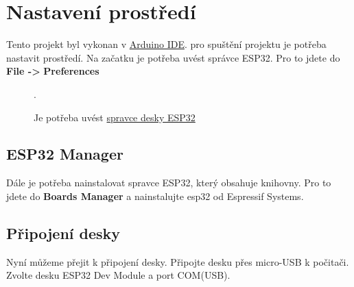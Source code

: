 \graphicspath{{Images/}}
\hypersetup{linkcolor=blue, urlcolor=blue}

\vspace{170pt}

\section{Nastavení prostředí}

\begin{spacing}{1.5}
    \fontsize{14}{14}\selectfont
    Tento projekt byl vykonan v \href{https://www.arduino.cc/en/software}{Arduino IDE}. pro spuštění projektu je potřeba nastavit prostředí. Na začatku je potřeba uvést správce ESP32. Pro to jdete do \textbf{File -> }\textbf{Preferences}
    
\begin{figure}[h]
    \centering
    \caption{Je potřeba uvést \href{https://dl.espressif.com/dl/package_esp32_index.json}{spravce desky ESP32}}.
    \label{step}
\end{figure} 

\end{spacing}

\subsection{ESP32 Manager}

\begin{spacing}{1.5}
\fontsize{14}{14}\selectfont
Dále je potřeba nainstalovat spravce ESP32, který obsahuje knihovny. Pro to jdete do \textbf{Boards Manager} a nainstalujte esp32 od Espressif Systems.
\end{spacing}

\vspace{10pt}

\subsection{Připojení desky}
\begin{spacing}{1.5}
\fontsize{14}{14}\selectfont
Nyní můžeme přejit k připojení desky. Připojte desku přes micro-USB k počitači. Zvolte desku ESP32 Dev Module a port COM(USB).  
\end{spacing}

